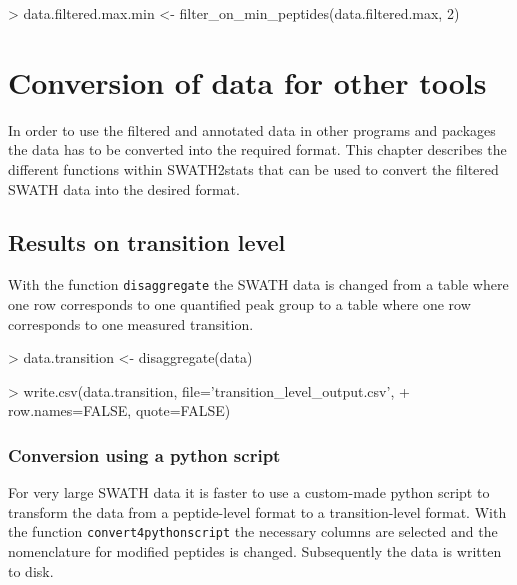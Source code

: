 \documentclass[a4paper]{article}
\begin{document}
\begin{Schunk}
\begin{Sinput}
> data.filtered.max.min <- filter_on_min_peptides(data.filtered.max, 2)
\end{Sinput}
\end{Schunk}


\section{Conversion of data for other tools}
In order to use the filtered and annotated data in other programs and packages the data has to be converted into the required format. This chapter describes the different functions within SWATH2stats that can be used to convert the filtered SWATH data into the desired format.


\subsection{Results on transition level}
With the function \texttt{disaggregate} the SWATH data is changed from a table where one row corresponds to one quantified peak group to a table where one row corresponds to one measured transition.

\begin{Schunk}
\begin{Sinput}
> data.transition <- disaggregate(data)
\end{Sinput}
\end{Schunk}

\begin{Schunk}
\begin{Sinput}
> write.csv(data.transition, file='transition_level_output.csv',
+           row.names=FALSE, quote=FALSE)
\end{Sinput}
\end{Schunk}

\subsubsection{Conversion using a python script}
For very large SWATH data it is faster to use a custom-made python script to transform the data from a peptide-level format to a transition-level format. With the function \texttt{convert4pythonscript} the necessary columns are selected and the nomenclature for modified peptides is changed. Subsequently the data is written to disk.
\end{document}
